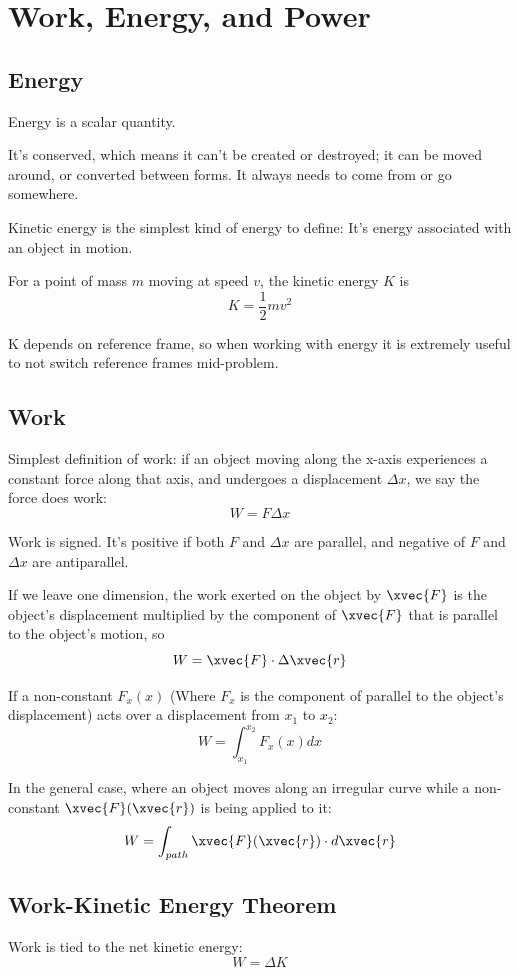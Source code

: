 \documentclass{article}
\begin{document}
\section{Work, Energy, and Power}
\subsection{Energy}
Energy is a scalar quantity.

It's conserved, which means it can't be created or destroyed; it can be moved around, or converted between forms. It always needs to come from or go somewhere.

Kinetic energy is the simplest kind of energy to define: It's energy associated with an object in motion.

For a point of mass $m$ moving at speed $v$, the kinetic energy $K$ is
$$K=\frac{1}{2}mv^2$$

K depends on reference frame, so when working with energy it is extremely useful to not switch reference frames mid-problem.

\subsection{Work}
Simplest definition of work: if an object moving along the x-axis experiences a constant force along that axis, and undergoes a displacement $\Delta x$, we say the force does work:
$$W = F\Delta x$$

Work is signed. It's positive if both $F$ and $\Delta x$ are parallel, and negative of $F$ and $\Delta x$ are antiparallel.

If we leave one dimension, the work exerted on the object by $\xvec{F}$ is the object's displacement multiplied by the component of $\xvec{F}$ that is parallel to the object's motion, so
$$W = \xvec{F} \cdot \Delta \xvec{r}$$

If a non-constant $F_x(x)$ (Where $F_x$ is the component of  parallel to the object's displacement) acts over a displacement from $x_1$ to $x_2$:
$$W = \int_{x_1}^{x_2}{F_x(x)dx}$$

In the general case, where an object moves along an irregular curve while a non-constant $\xvec{F}(\xvec{r})$ is being applied to it:
$$W = \int_{path}^{}{\xvec{F}(\xvec{r}) \cdot d\xvec{r}}$$

\subsection{Work-Kinetic Energy Theorem}
Work is tied to the net kinetic energy:
$$ W = \Delta K $$
\end{document}
